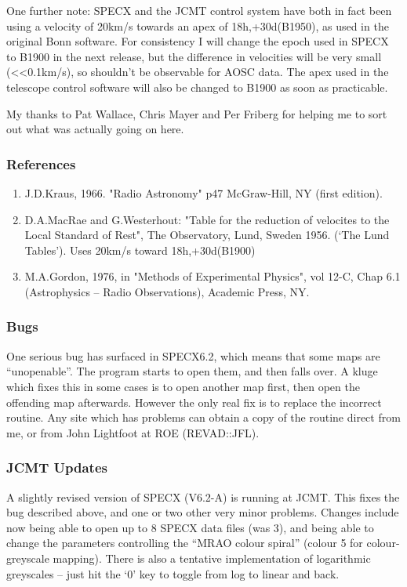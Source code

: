 \documentclass[twoside,11pt]{article}
\renewcommand{\_}{\texttt{\symbol{95}}}
\begin{document}
One further note: SPECX and the JCMT control system have both in fact been
using a velocity of 20km/s towards an apex of 18h,+30d(B1950), as used in the
original Bonn software. For consistency I will change the epoch used in SPECX
to B1900 in the next release, but the difference in velocities will be very
small (<<0.1km/s), so shouldn't be observable for AOSC data. The apex used in
the telescope control software will also be changed to B1900 as soon as
practicable. 

My thanks to Pat Wallace, Chris Mayer and Per Friberg for helping me to sort
out what was actually going on here.

\subsubsection{References}

\begin{enumerate}
\item J.D.Kraus, 1966. "Radio Astronomy" p47 McGraw-Hill, NY (first edition).
\item D.A.MacRae and G.Westerhout: "Table for the reduction of velocites to the
    Local Standard of Rest", The Observatory, Lund, Sweden 1956. (`The Lund
    Tables'). Uses 20km/s toward 18h,+30d(B1900)
\item M.A.Gordon, 1976, in "Methods of Experimental Physics", vol 12-C, Chap 6.1
    (Astrophysics -- Radio Observations), Academic Press, NY.
\end{enumerate}

\subsubsection{Bugs}

One serious bug has surfaced in SPECX6.2, which means that some maps are
``unopenable''. The program starts to open them, and then falls over. A kluge
which fixes this in some cases is to open another map first, then open the
offending map afterwards. However the only real fix is to replace the 
incorrect routine. Any site which has problems can obtain a copy of the
routine direct from me, or from John Lightfoot at ROE (REVAD::JFL).

\subsubsection{JCMT Updates}

A slightly revised version of SPECX (V6.2-A) is running at JCMT. This fixes
the bug described above, and one or two other very minor problems. Changes
include now being able to open up to 8 SPECX data files (was 3), and being
able to change the parameters controlling the ``MRAO colour spiral'' (colour 5
for colour-greyscale mapping). There is also a tentative implementation of
logarithmic greyscales -- just hit the `0' key to toggle from log to linear
and back.
\end{document}
